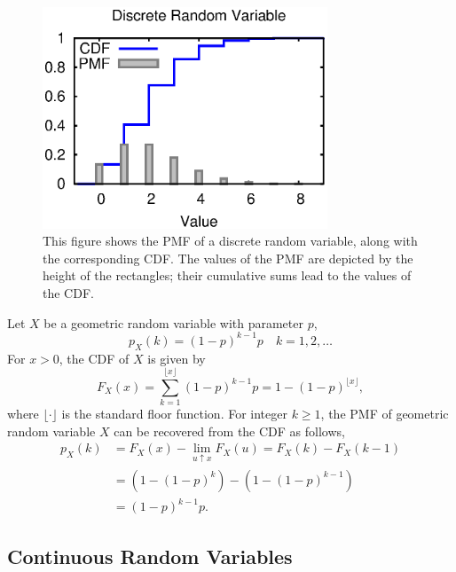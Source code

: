 \begin{figure}[ht]
\begin{center}
\includegraphics[width=8.5cm]{Figures/8chapter/discrete_cdf}
\end{center}
\caption{This figure shows the PMF of a discrete random variable, along with the corresponding CDF.
The values of the PMF are depicted by the height of the rectangles; their cumulative sums lead to the values of the CDF.}
\end{figure}

\begin{example}
Let $X$ be a geometric random variable with parameter $p$,
\begin{equation*}
p_X (k) = (1 - p)^{k-1} p \quad k = 1, 2, \ldots 
\end{equation*}
For $x > 0$, the CDF of $X$ is given by
\begin{equation*}
F_X (x) = \sum_{k = 1}^{\lfloor x \rfloor} (1 - p)^{k-1} p
= 1 - (1 - p)^{\lfloor x \rfloor} ,
\end{equation*}
where $\lfloor \cdot \rfloor$ is the standard floor function.
For integer $k \geq 1$, the PMF of geometric random variable $X$ can be recovered from the CDF as follows,
\begin{equation*}
\begin{split}
p_X (k) &= F_X (x) - \lim_{u \uparrow x} F_X (u) = F_X (k) - F_X (k-1) \\
&= \left( 1 - (1-p)^k \right) - \left( 1 - (1-p)^{k-1} \right) \\
&= (1 - p)^{k-1} p .
\end{split}
\end{equation*}
\end{example}


\subsection{Continuous Random Variables}

